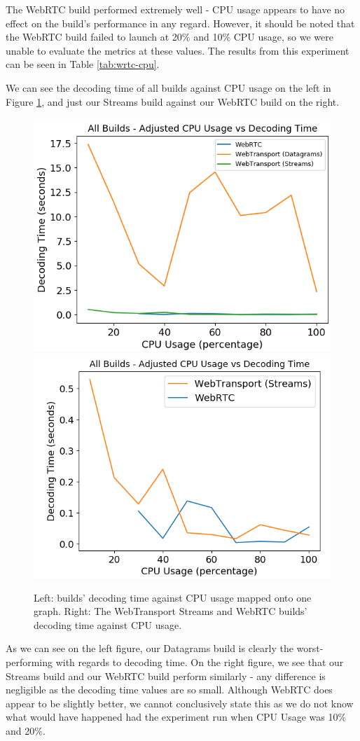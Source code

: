 The WebRTC build performed extremely well - CPU usage appears to have no effect on the build's performance in any regard. However, it should be noted that the WebRTC build failed to launch at 20\% and 10\% CPU usage, so we were unable to evaluate the metrics at these values. The results from this experiment can be seen in Table \ref{tab:wrtc-cpu}.

We can see the decoding time of all builds against CPU usage on the left in Figure \ref{fig:all-dec-cpu}, and just our Streams build against our WebRTC build on the right.

\begin{figure}[h]
    \centering
    \includegraphics[width=0.49\linewidth]{images/cpu/all-cpu-decode.png}
    \includegraphics[width=0.49\linewidth]{images/cpu/wrtc-streams-cpu-decode.png}
    \caption{Left: builds' decoding time against CPU usage mapped onto one graph. Right: The WebTransport Streams and WebRTC builds' decoding time against CPU usage.}
    \label{fig:all-dec-cpu} 
\end{figure}

As we can see on the left figure, our Datagrams build is clearly the worst-performing with regards to decoding time. On the right figure, we see that our Streams build and our WebRTC build perform similarly - any difference is negligible as the decoding time values are so small. Although WebRTC does appear to be slightly better, we cannot conclusively state this as we do not know what would have happened had the experiment run when CPU Usage was 10\% and 20\%.  

